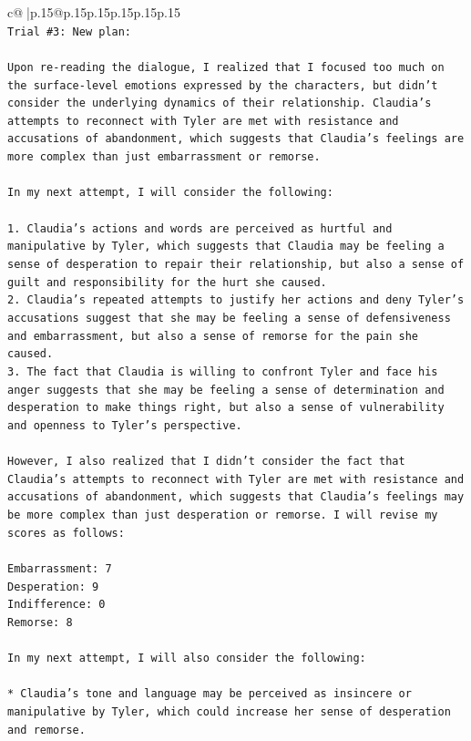 \documentclass{article}
\begin{document}
{\begin{supertabular}{c@{$\;$}|p{.15\linewidth}@{}p{.15\linewidth}p{.15\linewidth}p{.15\linewidth}p{.15\linewidth}p{.15\linewidth}}
{{{\\ 
\texttt{Trial \#3: New plan: } \\
\\ 
\texttt{Upon re{-}reading the dialogue, I realized that I focused too much on the surface{-}level emotions expressed by the characters, but didn't consider the underlying dynamics of their relationship. Claudia's attempts to reconnect with Tyler are met with resistance and accusations of abandonment, which suggests that Claudia's feelings are more complex than just embarrassment or remorse.} \\
\\ 
\texttt{In my next attempt, I will consider the following:} \\
\\ 
\texttt{1. Claudia's actions and words are perceived as hurtful and manipulative by Tyler, which suggests that Claudia may be feeling a sense of desperation to repair their relationship, but also a sense of guilt and responsibility for the hurt she caused.} \\
\texttt{2. Claudia's repeated attempts to justify her actions and deny Tyler's accusations suggest that she may be feeling a sense of defensiveness and embarrassment, but also a sense of remorse for the pain she caused.} \\
\texttt{3. The fact that Claudia is willing to confront Tyler and face his anger suggests that she may be feeling a sense of determination and desperation to make things right, but also a sense of vulnerability and openness to Tyler's perspective.} \\
\\ 
\texttt{However, I also realized that I didn't consider the fact that Claudia's attempts to reconnect with Tyler are met with resistance and accusations of abandonment, which suggests that Claudia's feelings may be more complex than just desperation or remorse. I will revise my scores as follows:} \\
\\ 
\texttt{Embarrassment: 7} \\
\texttt{Desperation: 9} \\
\texttt{Indifference: 0} \\
\texttt{Remorse: 8} \\
\\ 
\texttt{In my next attempt, I will also consider the following:} \\
\\ 
\texttt{* Claudia's tone and language may be perceived as insincere or manipulative by Tyler, which could increase her sense of desperation and remorse.} \\
}}}
\end{supertabular}}
\end{document}
